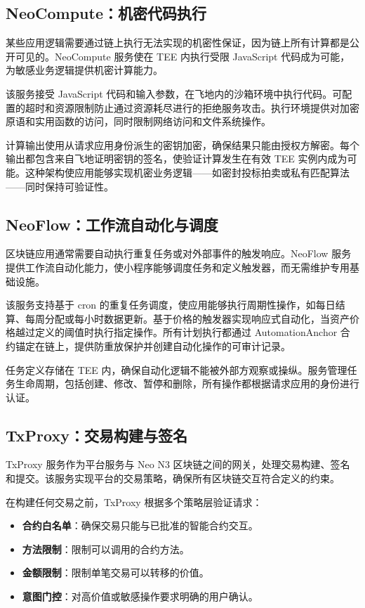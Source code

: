 \documentclass[11pt,a4paper]{article}
\begin{document}
\subsection{NeoCompute：机密代码执行}

某些应用逻辑需要通过链上执行无法实现的机密性保证，因为链上所有计算都是公开可见的。NeoCompute 服务使在 TEE 内执行受限 JavaScript 代码成为可能，为敏感业务逻辑提供机密计算能力。

该服务接受 JavaScript 代码和输入参数，在飞地内的沙箱环境中执行代码。可配置的超时和资源限制防止通过资源耗尽进行的拒绝服务攻击。执行环境提供对加密原语和实用函数的访问，同时限制网络访问和文件系统操作。

计算输出使用从请求应用身份派生的密钥加密，确保结果只能由授权方解密。每个输出都包含来自飞地证明密钥的签名，使验证计算发生在有效 TEE 实例内成为可能。这种架构使应用能够实现机密业务逻辑——如密封投标拍卖或私有匹配算法——同时保持可验证性。

\subsection{NeoFlow：工作流自动化与调度}

区块链应用通常需要自动执行重复任务或对外部事件的触发响应。NeoFlow 服务提供工作流自动化能力，使小程序能够调度任务和定义触发器，而无需维护专用基础设施。

该服务支持基于 cron 的重复任务调度，使应用能够执行周期性操作，如每日结算、每周分配或每小时数据更新。基于价格的触发器实现响应式自动化，当资产价格越过定义的阈值时执行指定操作。所有计划执行都通过 AutomationAnchor 合约锚定在链上，提供防重放保护并创建自动化操作的可审计记录。

任务定义存储在 TEE 内，确保自动化逻辑不能被外部方观察或操纵。服务管理任务生命周期，包括创建、修改、暂停和删除，所有操作都根据请求应用的身份进行认证。

\subsection{TxProxy：交易构建与签名}

TxProxy 服务作为平台服务与 Neo N3 区块链之间的网关，处理交易构建、签名和提交。该服务实现平台的交易策略，确保所有区块链交互符合定义的约束。

在构建任何交易之前，TxProxy 根据多个策略层验证请求：
\begin{itemize}
    \item \textbf{合约白名单}：确保交易只能与已批准的智能合约交互。
    \item \textbf{方法限制}：限制可以调用的合约方法。
    \item \textbf{金额限制}：限制单笔交易可以转移的价值。
    \item \textbf{意图门控}：对高价值或敏感操作要求明确的用户确认。
\end{itemize}
\end{document}
